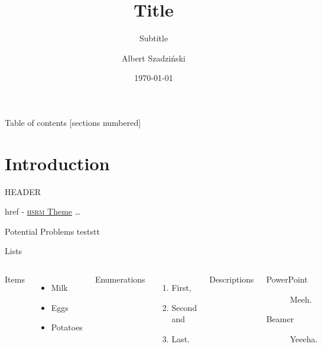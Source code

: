 \documentclass[10pt]{beamer}
\title{Title}
\subtitle{Subtitle}
\date{\today}
\author{Albert Szadziński}
\institute{University of Silesia}
\begin{document}
\maketitle

\begin{frame}{Table of contents}
  [sections numbered]
  \tableofcontents[hideallsubsections]
\end{frame}


\section{Introduction}


{


\begin{frame}[fragile]{HEADER}

  \alert{href} - \href{https://github.com/hsrmbeamertheme/hsrmbeamertheme}{\textsc{hsrm} Theme} \ldots
	\begin{alertblock}{Potential Problems}
			teststt
	\end{alertblock}
\end{frame}

}




\begin{frame}{Lists}
  \begin{columns}[T,onlytextwidth]
      Items
      \begin{itemize}
        \item Milk \item Eggs \item Potatoes
      \end{itemize}

      Enumerations
      \begin{enumerate}  
    \setcounter{density}{20}
        \item First, \item Second and \item Last.
      \end{enumerate}

      Descriptions
      \begin{description}
        \item[PowerPoint] Meeh. \item[Beamer] Yeeeha.
      \end{description}
  \end{columns}
\end{frame}
\end{document}
